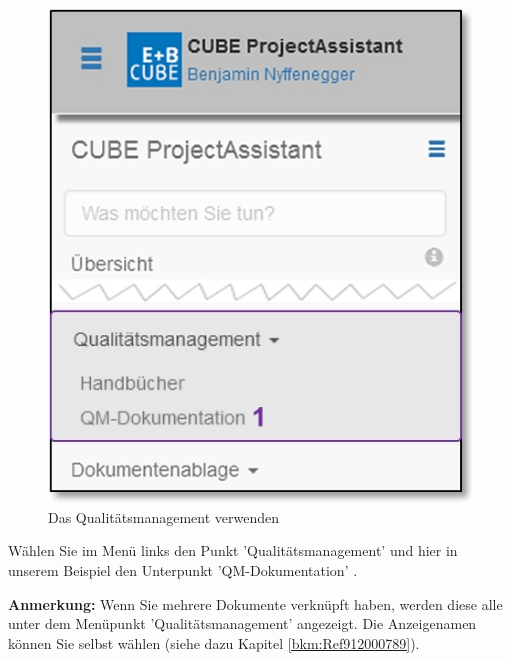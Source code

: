 \begin{figure}   %
  \vspace{-35pt}      %
  \begin{center}
    \includegraphics[width=1\linewidth]{../chapters/09_Qualitaetsmanagement/pictures/9-1_Menu_Qualitaetsmanagement.jpg}
  \end{center}
  \vspace{-20pt}
  \caption{Das Qualitätsmanagement verwenden}
  \vspace{-10pt}
\end{figure}

Wählen Sie im Menü links den Punkt 'Qualitätsmanagement' und hier in unserem Beispiel den Unterpunkt 'QM-Dokumentation' .
 
\vspace{2cm} 

\textbf{Anmerkung:} Wenn Sie mehrere Dokumente verknüpft haben, werden diese alle unter dem Menüpunkt 'Qualitätsmanagement' angezeigt. Die Anzeigenamen können Sie selbst wählen (siehe dazu Kapitel \ref{bkm:Ref912000789}). \\

